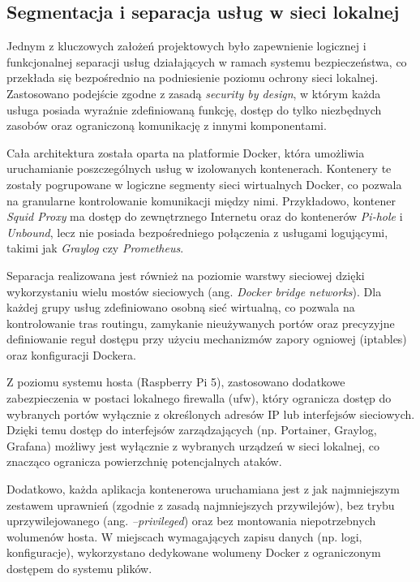 \documentclass[
    left=2.5cm,         %
    right=2.5cm,        %
    top=2.5cm,          %
    bottom=3cm,         %
    bindingoffset=6mm,  %
    nohyphenation=true %
]{eiti/eiti-thesis} %
\begin{document}
\subsection{Segmentacja i separacja usług w sieci lokalnej}

Jednym z kluczowych założeń projektowych było zapewnienie logicznej i funkcjonalnej separacji usług działających w ramach systemu bezpieczeństwa, co przekłada się bezpośrednio na podniesienie poziomu ochrony sieci lokalnej. Zastosowano podejście zgodne z zasadą \textit{security by design}, w którym każda usługa posiada wyraźnie zdefiniowaną funkcję, dostęp do tylko niezbędnych zasobów oraz ograniczoną komunikację z innymi komponentami.

Cała architektura została oparta na platformie Docker, która umożliwia uruchamianie poszczególnych usług w izolowanych kontenerach. Kontenery te zostały pogrupowane w logiczne segmenty sieci wirtualnych Docker, co pozwala na granularne kontrolowanie komunikacji między nimi. Przykładowo, kontener \textit{Squid Proxy} ma dostęp do zewnętrznego Internetu oraz do kontenerów \textit{Pi-hole} i \textit{Unbound}, lecz nie posiada bezpośredniego połączenia z usługami logującymi, takimi jak \textit{Graylog} czy \textit{Prometheus}.

Separacja realizowana jest również na poziomie warstwy sieciowej dzięki wykorzystaniu wielu mostów sieciowych (ang. \textit{Docker bridge networks}). Dla każdej grupy usług zdefiniowano osobną sieć wirtualną, co pozwala na kontrolowanie tras routingu, zamykanie nieużywanych portów oraz precyzyjne definiowanie reguł dostępu przy użyciu mechanizmów zapory ogniowej (iptables) oraz konfiguracji Dockera.

Z poziomu systemu hosta (Raspberry Pi 5), zastosowano dodatkowe zabezpieczenia w postaci lokalnego firewalla (ufw), który ogranicza dostęp do wybranych portów wyłącznie z określonych adresów IP lub interfejsów sieciowych. Dzięki temu dostęp do interfejsów zarządzających (np. Portainer, Graylog, Grafana) możliwy jest wyłącznie z wybranych urządzeń w sieci lokalnej, co znacząco ogranicza powierzchnię potencjalnych ataków.

Dodatkowo, każda aplikacja kontenerowa uruchamiana jest z jak najmniejszym zestawem uprawnień (zgodnie z zasadą najmniejszych przywilejów), bez trybu uprzywilejowanego (ang. \textit{--privileged}) oraz bez montowania niepotrzebnych wolumenów hosta. W miejscach wymagających zapisu danych (np. logi, konfiguracje), wykorzystano dedykowane wolumeny Docker z ograniczonym dostępem do systemu plików.
\end{document}

